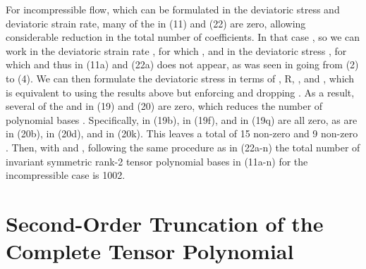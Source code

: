 For incompressible flow, which can be formulated in the deviatoric stress and deviatoric strain rate, many of the   in (11) and (22) are zero, allowing considerable reduction in the total number of coefficients.  In that case  , so we can work in the deviatoric strain rate  , for which  , and in the deviatoric stress  , for which   and thus   in (11a) and (22a) does not appear, as was seen in going from (2) to (4).  We can then formulate the deviatoric stress   in terms of  , R,  , and  , which is equivalent to using the results above but enforcing   and dropping  .  As a result, several of the   and   in (19) and (20) are zero, which reduces the number of polynomial bases  .  
Specifically,   in (19b),   in (19f), and   in (19q) are all zero, as are   in (20b),   in (20d), and   in (20k).  This leaves a total of 15 non-zero   and 9 non-zero  .  Then, with   and  , following the same procedure as in (22a-n) the total number of invariant symmetric rank-2 tensor polynomial bases   in (11a-n) for the incompressible case is 1002.  


\section{Second-Order Truncation of the Complete Tensor Polynomial}

